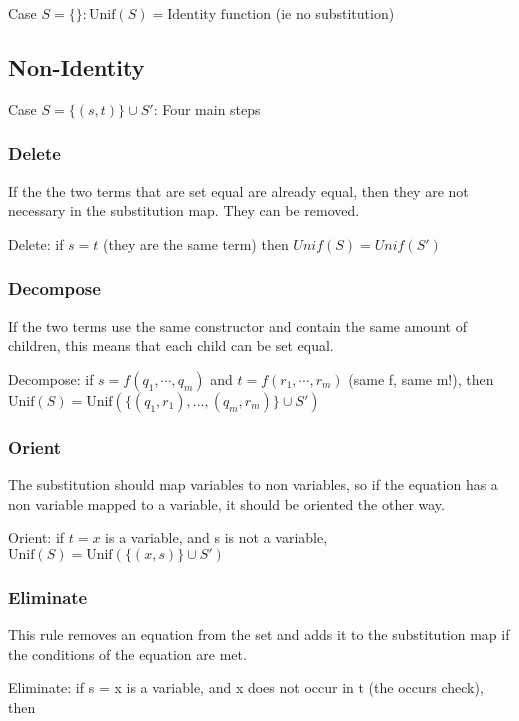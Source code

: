 Case $S = \{ \} : \text{Unif}(S) = \text{Identity function}$ (ie
no substitution)

\subsection{Non-Identity}

Case $S = \{(s, t)\} \cup S'$: Four main steps

\subsubsection{Delete}

If the the two terms that are set equal are already equal, then they are not necessary in the substitution map. They can be removed.

Delete: if $s = t$ (they are the same term)
then $Unif(S) = Unif(S')$

\subsubsection{Decompose}

If the two terms use the same constructor and contain the same amount of children, this means that each child can be set equal. 

Decompose: if $s = f(q_1, \cdots, q_m )$ and
$t = f(r_1, \cdots, r_m )$ (same f, same m!), then
$\text{Unif}(S) = \text{Unif}(\{(q_1 , r_1 ), ..., (q_m , r_m )\} \cup S')$

\subsubsection{Orient}

The substitution should map variables to non variables, so if the equation has a non variable mapped to a variable, it should be oriented the other way.

Orient: if $t = x$ is a variable, and s is not a
variable, $\text{Unif}(S) = \text{Unif} (\{(x,s)\} \cup S')$

\subsubsection{Eliminate}

This rule removes an equation from the set and adds it to the substitution map if the conditions of the equation are met.

Eliminate: if s = x is a variable, and
x does not occur in t (the occurs
check), then

